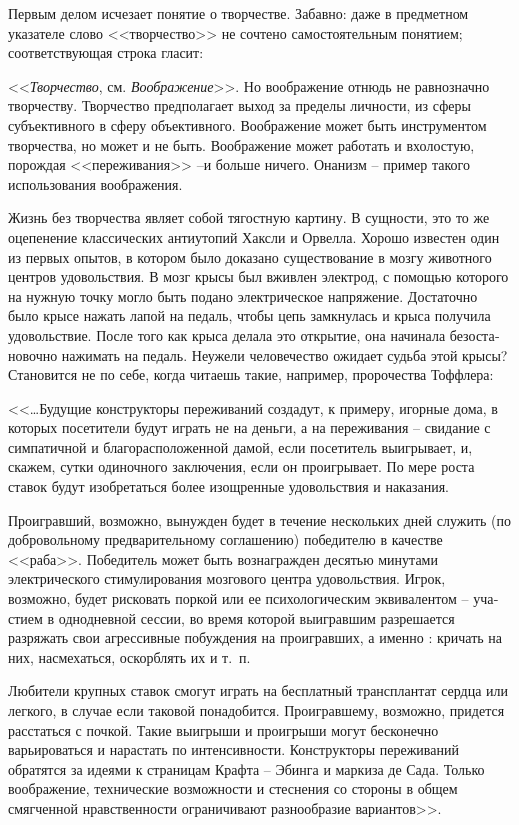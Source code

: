 \documentclass{book}
\begin{document}
Первым делом исчезает понятие о творчестве. Забавно: да­же в предметном указателе слово <<творчество>> не сочтено са­мостоятельным понятием; соответствующая строка гласит:

<<\textit{Творчество},  см. \textit{Воображение}>>.  Но воображение отнюдь не равнозначно творчеству. Творчество предполагает выход за пределы личности, из сферы субъективного в сферу объективного. Воображение может быть инструментом творчества, но может и не быть. Воображение может работать и вхолостую, порож­дая <<переживания>> --и больше ничего. Онанизм -- пример та­кого использования воображения.

Жизнь без творчества являет собой тягостную картину. В сущ­ности, это то же оцепенение классических антиутопий Хаксли и Орвелла. Хорошо известен один из первых опытов, в котором было доказано существование в мозгу животного центров удо­вольствия. В мозг крысы был вживлен электрод, с помощью которого на нужную точку могло быть подано электрическое напряжение. Достаточно было крысе нажать лапой на педаль, чтобы цепь замкнулась и крыса получила удовольствие. Пос­ле того как крыса делала это открытие, она начинала безоста­новочно нажимать на педаль. Неужели человечество ожидает судьба этой крысы? Становится не по себе, когда читаешь такие, например, пророчества Тоффлера:

<<\ldots Будущие конструкторы переживаний создадут, к приме­ру, игорные дома, в которых посетители будут играть не на деньги, а на переживания -- свидание с симпатичной и благо­расположенной дамой, если посетитель выигрывает, и, скажем, сутки одиночного заключения, если он проигрывает. По мере роста ставок будут изобретаться более изощренные удовольст­вия и наказания.

Проигравший, возможно, вынужден будет в течение несколь­ких дней служить (по добровольному предварительному согла­шению) победителю в качестве <<раба>>. Победитель может быть вознагражден десятью минутами электрического стимулирова­ния мозгового центра удовольствия. Игрок, возможно, будет рисковать поркой или ее психологическим эквивалентом -- уча­стием в однодневной сессии, во время которой выигравшим разрешается разряжать свои агрессивные побуждения на проиг­равших, а именно : кричать на них, насмехаться, оскорблять их и т.~п.

Любители крупных ставок смогут играть на бесплатный трансплантат сердца или легкого, в случае если таковой пона­добится. Проигравшему, возможно, придется расстаться с поч­кой. Такие выигрыши и проигрыши могут бесконечно варьироваться и нарастать по интенсивности. Конструкторы пережи­ваний обратятся за идеями к страницам Крафта -- Эбинга и мар­киза де Сада. Только воображение, технические возможности и стеснения со стороны в общем смягченной нравственности ограничивают разнообразие вариантов>>.%
\end{document}
